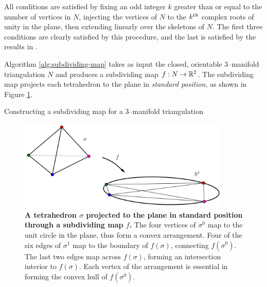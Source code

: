 All conditions are satisfied by fixing an odd integer $k$ greater than or equal to the number of vertices in $N$, injecting the vertices of $N$ to the $k^{\text{th}}$ complex roots of unity in the plane, then extending linearly over the skeletons of $N$.
The first three conditions are clearly satisfied by this procedure, and the last is satisfied by the results in \cite{PoonRub98}.

Algorithm \ref{alg:subdividing-map} takes as input the closed, orientable 3--manifold triangulation $N$ and produces a subdividing map $f:N\to\mathbb{R}^2$.
The subdividing map projects each tetrahedron to the plane in \emph{standard position}, as shown in Figure \ref{fig:standard-position}.



\begin{algorithm}
	\caption{Constructing a subdividing map for a 3--manifold triangulation}
	\label{alg:subdividing-map}
\end{algorithm}


\begin{figure}[h!]
	\centering
	\includegraphics[width=0.9\textwidth]{figures/standard-position.png}
	\caption{
		\textbf{A tetrahedron $\sigma$ projected to the plane in standard position through a subdividing map $f$.}
		The four vertices of $\sigma^0$ map to the unit circle in the plane, thus form a convex arrangement.
		Four of the six edges of $\sigma^1$ map to the boundary of $f(\sigma)$, connecting $f(\sigma^0)$.
		The last two edges map across $f(\sigma)$, forming an intersection interior to $f(\sigma)$.
		Each vertex of the arrangement is essential in forming the convex hull of $f(\sigma^0)$.
	}
	\label{fig:standard-position}
\end{figure}